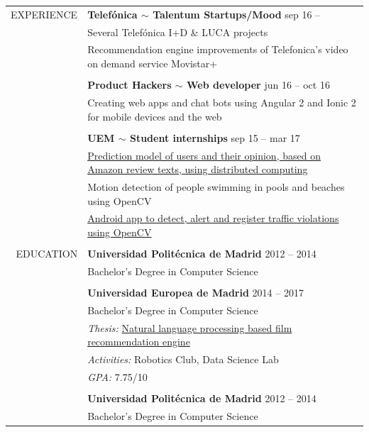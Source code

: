\documentclass[a4paper, 11pt]{article}
\begin{document}
\begin{longtable}{r|p{12cm}}
    EXPERIENCE
    & \textbf{Telefónica $\sim$ Talentum Startups/Mood} \hfill sep 16 --
    \\
    & Several Telefónica I+D \& LUCA projects
    \\
    & Recommendation engine improvements of Telefonica's video on demand service Movistar+
    \\\\
    & \textbf{Product Hackers $\sim$ Web developer} \hfill jun 16 -- oct 16
    \\
    & Creating web apps and chat bots using Angular 2 and Ionic 2 for mobile devices and the web
    \\\\
    & \textbf{UEM $\sim$ Student internships} \hfill sep 15 -- mar 17
    \\
    & \href{https://www.researchgate.net/publication/314142014_Prediction_of_User_Opinion_for_Products_-_A_Bag-of-Words_and_Collaborative_Filtering_based_Approach}{Prediction model of users and their opinion, based on Amazon review texts, using distributed computing}
    \\
    & Motion detection of people swimming in pools and beaches using OpenCV
    \\
    & \href{https://github.com/hugo19941994/infrac-coche}{Android app to detect, alert and register traffic violations using OpenCV}
    \\\\
    EDUCATION
    & \textbf{Universidad Politécnica de Madrid} \hfill 2012 -- 2014
    \\
    & Bachelor's Degree in Computer Science
    \\\\
    & \textbf{Universidad Europea de Madrid} \hfill 2014 -- 2017
    \\
    & Bachelor's Degree in Computer Science
    \\
    & \textit{Thesis:} \href{https://github.com/hugo19941994/movie-pepper-doc/raw/master/thesis.pdf}{Natural language processing based film recommendation engine}
    \\
    & \textit{Activities:} Robotics Club, Data Science Lab
    \\
    & \textit{GPA:} 7.75/10
    \\\\
    & \textbf{Universidad Politécnica de Madrid} \hfill 2012 -- 2014
    \\
    & Bachelor's Degree in Computer Science

\end{longtable}
\end{document}
